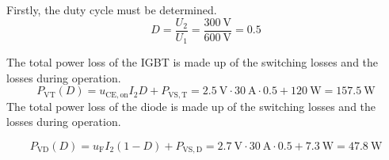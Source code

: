 \begin{solutionblock}
    Firstly, the duty cycle must be determined.
    \begin{equation}
D = \frac{U_2}{U_1} = \frac{\SI{300}{\volt}}{\SI{600}{\volt}} = 0.5
    \end{equation}

    The total power loss of the IGBT is made up of the switching losses and the losses during operation.
    \begin{equation}
    P_{\mathrm{VT}}(D) = u_{\mathrm{CE,on}} I_2 D +  P_{\mathrm{VS,T}} = \SI{2.5}{\volt} \cdot \SI{30}{\ampere} \cdot 0.5 + \SI{120}{\watt} = \SI{157.5}{\watt}
\end{equation}
The total power loss of the diode is made up of the switching losses and the losses during operation.

\begin{equation}
    P_{\mathrm{VD}}(D) = u_{\mathrm{F}} I_2 (1-D) +  P_{\mathrm{VS,D}} = \SI{2.7}{\volt} \cdot \SI{30}{\ampere} \cdot 0.5 + \SI{7.3}{\watt} = \SI{47.8}{\watt}
\end{equation}
\end{solutionblock}
    